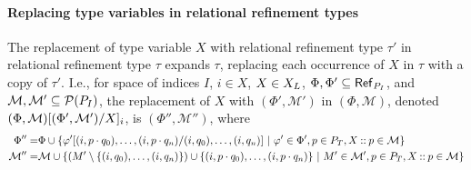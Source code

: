 \paragraph{Replacing type variables in relational refinement types}
%
The replacement of type variable $X$ with relational refinement type
$\tau'$ in relational refinement type $\tau$ expands $\tau$, replacing
each occurrence of $X$ in $\tau$ with a copy of $\tau'$.
%
I.e., for space of indices $I$, $i \in X$, $X \in \lfpvars$,
$\Phi, \Phi' \subseteq \refpreds{ \idxpos{I} }$, and %
$\mathcal{M}, \mathcal{M}' \subseteq \pset(\idxpos{I})$, the
replacement of $X$ with $(\Phi', \mathcal{M}')$ in
$(\Phi, \mathcal{M})$, denoted
$\replace{(\Phi, \mathcal{M})}{X}{(\Phi', \mathcal{M}')}_i$, is
$(\Phi'', \mathcal{M}'')$, where
%
\begin{align*}
  \Phi'' = & \Phi \union %
             \setformer{
             \replace{ \varphi' }{ (i, q_0), \ldots, (i, q_n) }{ (i, p \concat q_0), \ldots, (i, p \concat q_n) } }{
             \varphi' \in \Phi', p \in \typos, %
             X \cons p \in \mathcal{M} } \\
  \mathcal{M}'' = & \mathcal{M} \union %
                    \setformer{
                    (M' \setminus \elts{ (i, q_0), \ldots, (i, q_n) }) \union
                    \elts{ (i, p \concat q_0), \ldots, (i, p \concat q_n) }
                    }{
                    M' \in \mathcal{M'}, p \in \typos, %
                    X \cons p \in \mathcal{M} }
\end{align*}
%

